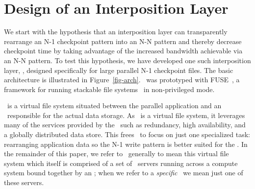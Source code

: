 \section{Design of an Interposition Layer}
\label{arch}



We start with the hypothesis that an interposition layer can transparently
rearrange an N-1 checkpoint pattern into an N-N pattern and thereby decrease
checkpoint time by taking advantage of the increased bandwidth achievable via
an N-N pattern. To test this hypothesis, we have developed one such
interposition layer, \plfs, designed specifically for large parallel N-1
checkpoint files. The basic architecture is illustrated in
Figure~\ref{fig-arch}. \plfs\ was prototyped with FUSE~\cite{fuse}, a 
framework for running stackable file systems~\cite{usenix00fist} in 
non-privileged mode.


\plfs\ is a virtual file system situated between the parallel application and
an \upfs\ responsible for the actual data storage. As \plfs\ is a virtual file
system, it leverages many of the services provided by the \upfs\ such as
redundancy, high availability, and a globally distributed data store.  This
frees \plfs\ to focus on just one specialized task: rearranging application
data so the N-1 write pattern is better suited for the \upfs.  In the remainder
of this paper,  we refer to \plfs\ generally to mean this virtual file system
which itself is comprised of a set of \plfs\ servers running across a compute
system bound together by an \upfs; when we refer to a {\em specific} \plfs\ we
mean just one of these servers.




